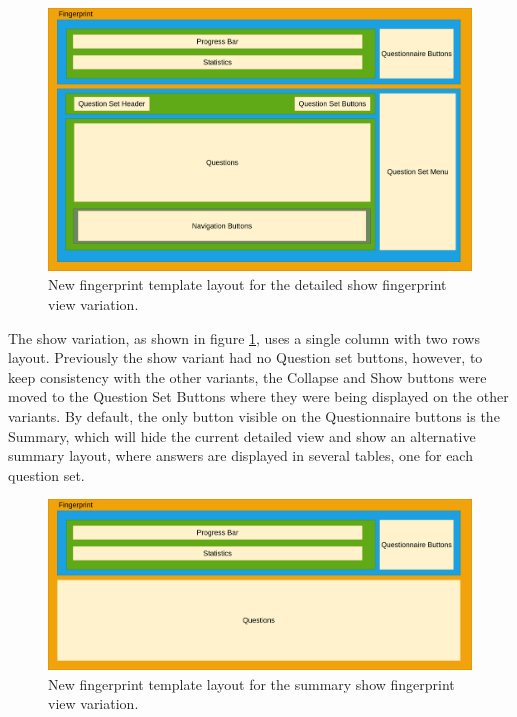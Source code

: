 \begin{figure}[H]
    \center
    \includegraphics[width=\textwidth]{fingerprint-show-detailed-after-diagram}
    \caption{New fingerprint template layout for the detailed show fingerprint view variation.}
    \label{fig:fingerprint-show-detailed-after-diagram}
\end{figure}

The show variation, as shown in figure \ref{fig:fingerprint-show-detailed-after-diagram}, uses a single column with two rows layout.
Previously the show variant had no Question set buttons, however, to keep consistency with the other variants, the Collapse and Show buttons were moved to the Question Set Buttons where they were being displayed on the other variants.
By default, the only button visible on the Questionnaire buttons is the Summary, which will hide the current detailed view and show an alternative summary layout, where answers are displayed in several tables, one for each question set.

\begin{figure}[H]
    \center
    \includegraphics[width=\textwidth]{fingerprint-show-summary-after-diagram}
    \caption{New fingerprint template layout for the summary show fingerprint view variation.}
    \label{fig:fingerprint-show-summary-after-diagram}
\end{figure}

